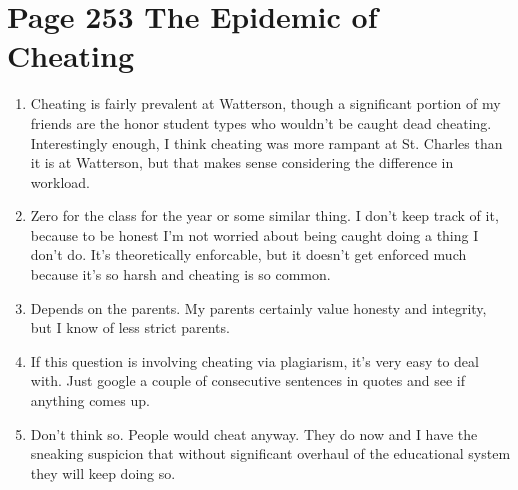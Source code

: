\documentclass[11pt]{article}
\begin{document}
\section{Page 253 The Epidemic of Cheating}
\begin{enumerate}
	\item Cheating is fairly prevalent at Watterson, though a significant portion 
		of my friends are the honor student types who wouldn't be caught dead
		cheating.  Interestingly enough, I think cheating was more rampant at St.
		Charles than it is at Watterson, but that makes sense considering the
		difference in workload.
	\item Zero for the class for the year or some similar thing.  I don't keep
		track of it, because to be honest I'm not worried about being caught doing 
		a thing I don't do.  It's theoretically enforcable, but it doesn't get 
		enforced much because it's so harsh and cheating is so common.
	\item Depends on the parents.  My parents certainly value honesty and 
		integrity, but I know of less strict parents.
	\item If this question is involving cheating via plagiarism, it's very easy to 
		deal with.  Just google a couple of consecutive sentences in quotes and 
		see if anything comes up.
	\item Don't think so.  People would cheat anyway.  They do now and I have the
		sneaking suspicion that without significant overhaul of the educational
		system they will keep doing so.
\end{enumerate}
\end{document}
